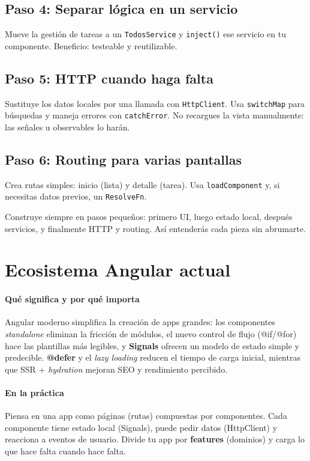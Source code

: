\documentclass[11pt,a4paper]{article}
\begin{document}
\subsection{Paso 4: Separar lógica en un servicio}
Mueve la gestión de tareas a un \texttt{TodosService} y \texttt{inject()} ese servicio en tu componente. Beneficio: testeable y reutilizable.

\subsection{Paso 5: HTTP cuando haga falta}
Sustituye los datos locales por una llamada con \texttt{HttpClient}. Usa \texttt{switchMap} para búsquedas y maneja errores con \texttt{catchError}. No recargues la vista manualmente: las señales u observables lo harán.

\subsection{Paso 6: Routing para varias pantallas}
Crea rutas simples: inicio (lista) y detalle (tarea). Usa \texttt{loadComponent} y, si necesitas datos previos, un \texttt{ResolveFn}.

\begin{tipbox}
Construye siempre en pasos pequeños: primero UI, luego estado local, después servicios, y finalmente HTTP y routing. Así entenderás cada pieza sin abrumarte.
\end{tipbox}


\section{Ecosistema Angular actual}
\paragraph{Qué significa y por qué importa}
Angular moderno simplifica la creación de apps grandes: los componentes \emph{standalone} eliminan la fricción de módulos, el nuevo control de flujo (@if/@for) hace las plantillas más legibles, y \textbf{Signals} ofrecen un modelo de estado simple y predecible. \textbf{@defer} y el \emph{lazy loading} reducen el tiempo de carga inicial, mientras que SSR + \emph{hydration} mejoran SEO y rendimiento percibido.

\paragraph{En la práctica}
Piensa en una app como páginas (rutas) compuestas por componentes. Cada componente tiene estado local (Signals), puede pedir datos (HttpClient) y reacciona a eventos de usuario. Divide tu app por \textbf{features} (dominios) y carga lo que hace falta cuando hace falta.
\end{document}
